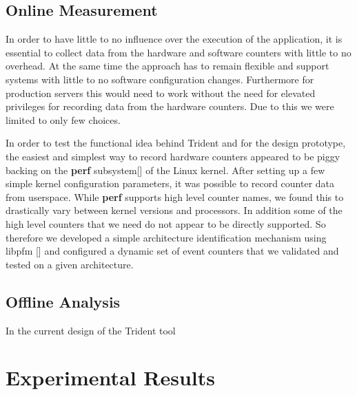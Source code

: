 \documentclass{webofc}
\begin{document}
\subsection{Online Measurement}

In order to have little to no influence over the execution of the application, it is essential to collect data from the hardware and software counters with little to no overhead. At the same time the approach has to remain flexible and support systems with little to no software configuration changes. Furthermore for production servers this would need to work without the need for elevated privileges for recording data from the hardware counters. Due to this we were limited to only few choices. 

In order to test the functional idea behind Trident and for the design prototype, the easiest and simplest way to record hardware counters appeared to be piggy backing on the \textbf{perf} subsystem[] of the Linux kernel. After setting up a few simple kernel configuration parameters, it was possible to record counter data from userspace. While \textbf{perf} supports high level counter names, we found this to drastically vary between kernel versions and processors. In addition some of the high level counters that we need do not appear to be directly supported. So therefore we developed a simple architecture identification mechanism using libpfm [] and configured a dynamic set of event counters that we validated and tested on a given architecture.

\subsection{Offline Analysis}

In the current design of the Trident tool

\section{Experimental Results}
\end{document}
